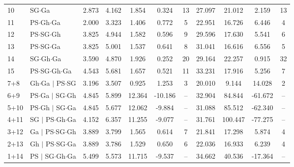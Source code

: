 \documentclass[sigconf]{acmart}
\begin{document}
\begin{table}[t]
{\begin{tabular}{l l c cccc cccc}
\rowcolor{singleviewbg}
10 & SG$\cdot$Ga & 2.873 & 4.162 & 1.854 & 0.324 & 13 & 27.097 & 21.012 & 2.159 & 13 \\

\rowcolor{singleviewbg}
11 & PS$\cdot$Gh$\cdot$Ga & 2.000 & 3.323 & 1.406 & 0.772 & 5 & 22.951 & 16.726 & 6.446 & 4 \\

\rowcolor{singleviewbg}
12 & PS$\cdot$SG$\cdot$Gh & 3.825 & 4.944 & 1.582 & 0.596 & 9 & 29.596 & 17.630 & 5.541 & 6 \\

\rowcolor{singleviewbg}
13 & PS$\cdot$SG$\cdot$Ga & 3.825 & 5.001 & 1.537 & 0.641 & 8 & 31.041 & 16.616 & 6.556 & 5 \\

\rowcolor{singleviewbg}
14 & SG$\cdot$Gh$\cdot$Ga & 3.590 & 4.870 & 1.926 & 0.252 & 20 & 29.164 & 22.257 & 0.915 & 32 \\

\rowcolor{singleviewbg}
15 & PS$\cdot$SG$\cdot$Gh$\cdot$Ga & 4.543 & 5.681 & 1.657 & 0.521 & 11 & 33.231 & 17.916 & 5.256 & 7 \\

\midrule

\rowcolor{multiviewbg}
7+8 & Gh$\cdot$Ga $\mid$ PS$\cdot$SG & 3.196 & 3.507 & 0.925 & 1.253 & 3 & 20.010 & 9.144 & 14.028 & 2 \\

\rowcolor{multiviewbg}
6+9 & PS$\cdot$Ga $\mid$ SG$\cdot$Gh & 4.845 & 5.899 & 12.364 & -10.186 & -- & 32.904 & 84.844 & -61.672 & -- \\

\rowcolor{multiviewbg}
5+10 & PS$\cdot$Gh $\mid$ SG$\cdot$Ga & 4.845 & 5.677 & 12.062 & -9.884 & -- & 31.088 & 85.512 & -62.340 & -- \\

\rowcolor{multiviewbg}
4+11 & SG $\mid$ PS$\cdot$Gh$\cdot$Ga & 4.152 & 6.357 & 11.255 & -9.077 & -- & 31.761 & 100.447 & -77.275 & -- \\

\rowcolor{multiviewbg}
3+12 & Ga $\mid$ PS$\cdot$SG$\cdot$Gh & 3.889 & 3.799 & 1.565 & 0.614 & 7 & 21.841 & 17.298 & 5.874 & 4 \\

\rowcolor{multiviewbg}
2+13 & Gh $\mid$ PS$\cdot$SG$\cdot$Ga & 3.889 & 3.786 & 1.529 & 0.650 & 6 & 22.036 & 16.933 & 6.239 & 4 \\

\rowcolor{multiviewbg}
1+14 & PS $\mid$ SG$\cdot$Gh$\cdot$Ga & 5.499 & 5.573 & 11.715 & -9.537 & -- & 34.662 & 40.536 & -17.364 & -- \\
    \bottomrule
  \end{tabular}}
\end{table}
\raggedbottom
\end{document}
